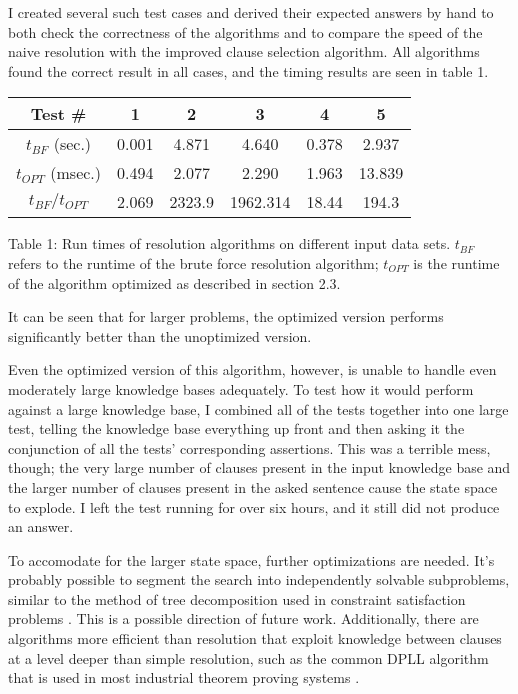 \documentclass[english]{article}
\providecommand{\tabularnewline}{\\}
\begin{document}
I created several such test cases and derived their expected answers
by hand to both check the correctness of the algorithms and to compare
the speed of the naive resolution with the improved clause selection
algorithm. All algorithms found the correct result in all cases, and
the timing results are seen in table 1. %
\begin{table}
\begin{centering}
\begin{tabular}{|c|c|c|c|c|c|}
\hline 
Test \# & 1 & 2 & 3 & 4 & 5\tabularnewline
\hline
\hline 
$t_{BF}$ (sec.) & 0.001 & 4.871 & 4.640 & 0.378 & 2.937\tabularnewline
\hline 
$t_{OPT}$ (msec.) & 0.494 & 2.077 & 2.290 & 1.963 & 13.839\tabularnewline
\hline 
$t_{BF}/t_{OPT}$ & 2.069 & 2323.9 & 1962.314 & 18.44 & 194.3\tabularnewline
\hline
\end{tabular}
\par\end{centering}

Table 1: Run times of resolution algorithms on different input data
sets. $t_{BF}$ refers to the runtime of the brute force resolution
algorithm; $t_{OPT}$ is the runtime of the algorithm optimized as
described in section 2.3.
\end{table}
 It can be seen that for larger problems, the optimized version performs
significantly better than the unoptimized version.

Even the optimized version of this algorithm, however, is unable to
handle even moderately large knowledge bases adequately. To test how
it would perform against a large knowledge base, I combined all of
the tests together into one large test, telling the knowledge base
everything up front and then asking it the conjunction of all the
tests' corresponding assertions. This was a terrible mess, though;
the very large number of clauses present in the input knowledge base
and the larger number of clauses present in the asked sentence cause
the state space to explode. I left the test running for over six hours,
and it still did not produce an answer.

To accomodate for the larger state space, further optimizations are
needed. It's probably possible to segment the search into independently
solvable subproblems, similar to the method of tree decomposition
used in constraint satisfaction problems \cite{RussellNorvigAI}.
This is a possible direction of future work. Additionally, there are
algorithms more efficient than resolution that exploit knowledge between
clauses at a level deeper than simple resolution, such as the common
DPLL algorithm that is used in most industrial theorem proving systems
\cite{DPLLUsage}. 



\end{document}

